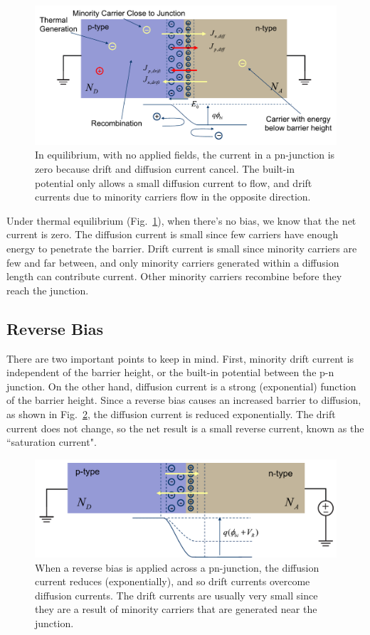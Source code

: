 \begin{figure}[tb]
\begin{center}
\includegraphics[width=.75\columnwidth]{slide35}
\end{center}
\caption{In equilibrium, with no applied fields, the current in a pn-junction is zero because drift and diffusion current cancel.  The built-in potential only allows a small diffusion current to flow, and drift currents due to minority carriers flow in the opposite direction.} \label{fig:slide35}
\end{figure}

Under thermal equilibrium (Fig.~\ref{fig:slide35}), when there's no bias, we know that the net current is zero.  The diffusion current is small since few carriers have enough energy to penetrate the barrier.   Drift current is small since minority carriers are few and far between, and only minority carriers generated within a diffusion length can contribute current.  Other minority carriers recombine before they reach the junction.

 

\subsection{Reverse Bias}

There are two important points to keep in mind.  First, minority drift current is independent of the barrier height, or the built-in potential between the p-n junction.  On the other hand, diffusion current is a strong (exponential) function of the barrier height.  Since a reverse bias causes an increased barrier to diffusion, as shown in Fig.~\ref{fig:slide36}, the diffusion current is reduced exponentially.  The drift current does not change, so the net result is a small reverse current, known as the ``saturation current".  
 

\begin{figure}[tb]
\begin{center}
\includegraphics[width=.75\columnwidth]{slide36}
\end{center}
\caption{When a reverse bias is applied across a pn-junction, the diffusion current reduces (exponentially), and so drift currents overcome diffusion currents.  The drift currents are usually very small since they are a result of minority carriers that are generated near the junction. } \label{fig:slide36}
\end{figure}

